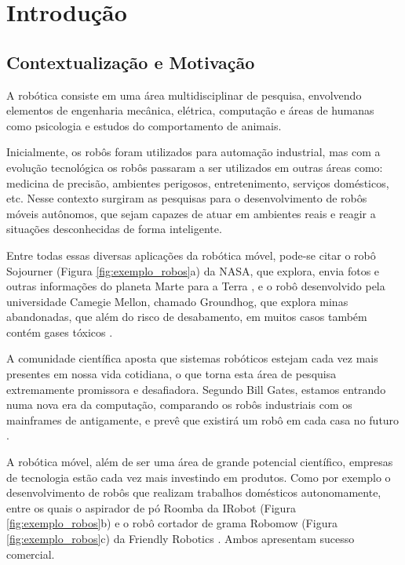 % 
% 
% 

\pagestyle{chapterst}

\chapter{Introdução}
\label{introducao}

\section{Contextualização e Motivação}
\label{contextualizacao_motivacao}
A robótica consiste em uma área multidisciplinar de pesquisa, envolvendo elementos de engenharia mecânica, elétrica, computação e áreas de humanas como psicologia e estudos do comportamento de animais.

Inicialmente, os robôs foram utilizados para automação industrial, mas com a evolução tecnológica os robôs passaram a ser utilizados em outras áreas como: medicina de precisão, ambientes perigosos, entretenimento, serviços domésticos, etc. Nesse contexto surgiram as pesquisas para o desenvolvimento de robôs móveis autônomos, que sejam capazes de atuar em ambientes reais e reagir a situações desconhecidas de forma inteligente.

Entre todas essas diversas aplicações da robótica móvel, pode-se citar o robô Sojourner (Figura \ref{fig:exemplo_robos}a) da NASA, que explora, envia fotos e outras informações do planeta Marte para a Terra \cite{Nasa2007}, e o robô desenvolvido pela universidade Camegie Mellon, chamado Groundhog, que explora minas abandonadas, que além do risco de desabamento, em muitos casos também contém gases tóxicos \cite{Thrun2004}.

A comunidade científica aposta que sistemas robóticos estejam cada vez mais presentes em nossa vida cotidiana, o que torna esta área de pesquisa extremamente promissora e desafiadora. Segundo Bill Gates, estamos entrando numa nova era da computação, comparando os robôs industriais com os mainframes de antigamente, e prevê que existirá um robô em cada casa no futuro \cite{Gates2007}.

A robótica móvel, além de ser uma área de grande potencial científico, empresas de tecnologia estão cada vez mais investindo em produtos. Como por exemplo o desenvolvimento de robôs que realizam trabalhos domésticos autonomamente,  entre os quais o aspirador de pó Roomba da IRobot \cite{IRobot2007} (Figura \ref{fig:exemplo_robos}b) e o robô cortador de grama Robomow (Figura \ref{fig:exemplo_robos}c) da Friendly Robotics \cite{FriendlyRobotics2007}. Ambos apresentam sucesso comercial. 

